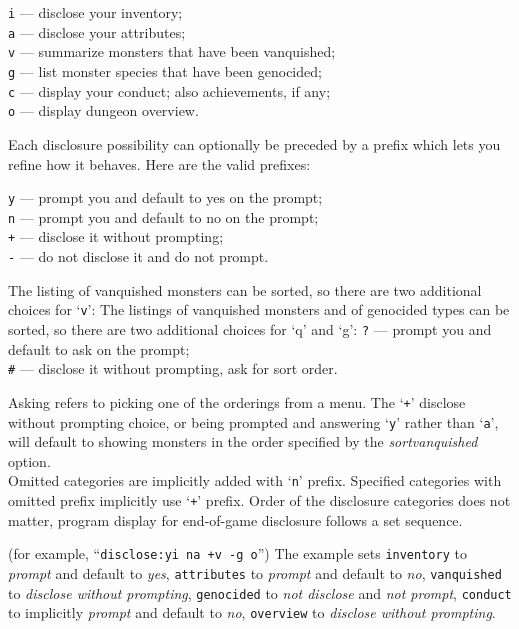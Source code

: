\documentclass[titlepage]{article}
\begin{document}
\begin{description}[font=\mdseries\itshape]
\texttt{i} --- disclose your inventory;\\
\texttt{a} --- disclose your attributes;\\
\texttt{v} --- summarize monsters that have been vanquished;\\
\texttt{g} --- list monster species that have been genocided;\\
\texttt{c} --- display your conduct; also achievements, if any;\\
\texttt{o} --- display dungeon overview.

Each disclosure possibility can optionally be preceded by a prefix which
lets you refine how it behaves.  Here are the valid prefixes:

\texttt{y} --- prompt you and default to yes on the prompt;\\
\texttt{n} --- prompt you and default to no on the prompt;\\
\texttt{+} --- disclose it without prompting;\\
\texttt{-} --- do not disclose it and do not prompt.

The listing of vanquished monsters can be sorted,
so there are two additional choices for `\texttt{v}':
The listings of vanquished monsters and of genocided types can be sorted,
so there are two additional choices for `q' and `g':
\texttt{?} --- prompt you and default to ask on the prompt;\\
{\tt\#} --- disclose it without prompting, ask for sort order.

Asking refers to picking one of the orderings from a menu.
The `\texttt{+}' disclose without prompting choice,
or being prompted and answering `\texttt{y}' rather than `\texttt{a}',
will default to showing monsters in the order specified by the
\textit{sortvanquished} option.
\\
Omitted categories are implicitly added with `\texttt{n}' prefix.
Specified categories with omitted prefix implicitly use `\texttt{+}' prefix.
Order of the disclosure categories does not matter, program display for
end-of-game disclosure follows a set sequence.

(for example, ``\texttt{disclose:yi na +v -g o}'')
The example sets
\texttt{inventory} to \textit{prompt} and default to \textit{yes},
\texttt{attributes} to \textit{prompt} and default to \textit{no},
\texttt{vanquished} to \textit{disclose without prompting},
\texttt{genocided} to \textit{not disclose} and \textit{not prompt},
\texttt{conduct} to implicitly \textit{prompt} and default to \textit{no},
\texttt{overview} to \textit{disclose without prompting}.


\end{description}
\end{document}
